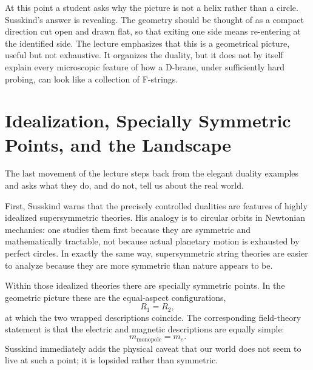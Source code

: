 At this point a student asks why the picture is not a helix rather than a circle. Susskind's answer is revealing. The geometry should be thought of as a compact direction cut open and drawn flat, so that exiting one side means re-entering at the identified side. The lecture emphasizes that this is a geometrical picture, useful but not exhaustive. It organizes the duality, but it does not by itself explain every microscopic feature of how a D-brane, under sufficiently hard probing, can look like a collection of F-strings.

\section{Idealization, Specially Symmetric Points, and the Landscape}

The last movement of the lecture steps back from the elegant duality examples and asks what they do, and do not, tell us about the real world.

First, Susskind warns that the precisely controlled dualities are features of highly idealized supersymmetric theories. His analogy is to circular orbits in Newtonian mechanics: one studies them first because they are symmetric and mathematically tractable, not because actual planetary motion is exhausted by perfect circles. In exactly the same way, supersymmetric string theories are easier to analyze because they are more symmetric than nature appears to be.

Within those idealized theories there are specially symmetric points. In the geometric picture these are the equal-aspect configurations,
\begin{equation}
R_1 = R_2,
\end{equation}
at which the two wrapped descriptions coincide. The corresponding field-theory statement is that the electric and magnetic descriptions are equally simple:
\begin{equation}
m_{\mathrm{monopole}} = m_e.
\end{equation}
Susskind immediately adds the physical caveat that our world does not seem to live at such a point; it is lopsided rather than symmetric.

